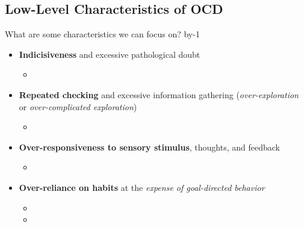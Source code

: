 \documentclass[t,aspectratio=169,xcolor=dvipsnames]{beamer}
\makeatletter
\newcommand{\trickbeamer}{\advance\beamer@slideinframe by-1}
\makeatother
\begin{document}
\subsection*{Low-Level Characteristics of OCD}
\begin{frame}[c]{What are some characteristics we can focus on?}
    \trickbeamer
    \begin{itemize}
        \item<+-> \textbf{Indicisiveness} and excessive pathological doubt
        \begin{itemize}
            \item[] %
        \end{itemize}
        
        \item<+-> \textbf{Repeated checking} and excessive information gathering (\textit{over-exploration} or \textit{over-complicated exploration})
        \begin{itemize}
            \item[] %
        \end{itemize}
        
        \item<+-> \textbf{Over-responsiveness to sensory stimulus}, thoughts, and feedback
        \begin{itemize}
            \item[] %
        \end{itemize}

        \item<+-> \textbf{Over-reliance on habits} at the \textit{expense of goal-directed behavior}
        \begin{itemize}
            \item[] %
            \item[] %
        \end{itemize}
    \end{itemize}
\end{frame}
\end{document}
